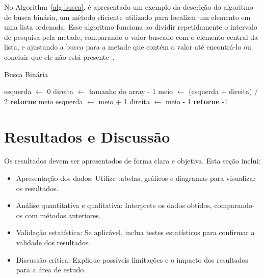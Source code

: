     No Algorithm~\ref{alg:busca}, é apresentado um exemplo da descrição do algoritmo de busca binária, um método eficiente utilizado para localizar um elemento em uma lista ordenada. Esse algoritmo funciona ao dividir repetidamente o intervalo de pesquisa pela metade, comparando o valor buscado com o elemento central da lista, e ajustando a busca para a metade que contém o valor até encontrá-lo ou concluir que ele não está presente~\cite{Cormen2009}.
    
    \begin{algorithm}
    \caption{Busca Binária}
    \label{alg:busca}
    \begin{algorithmic}[1]
            \State esquerda $\gets$ 0
            \State direita $\gets$ tamanho do array - 1
                \State meio $\gets$ (esquerda + direita) / 2
                    \State \textbf{retorne} meio
                    \State esquerda $\gets$ meio + 1
                \Else
                    \State direita $\gets$ meio - 1
                \EndIf
            \EndWhile
            \State \textbf{retorne} -1
        \EndProcedure
    \end{algorithmic}
\end{algorithm}

\section{ Resultados e Discussão}

Os resultados devem ser apresentados de forma clara e objetiva. Esta seção inclui:

\begin{itemize}
    \item Apresentação dos dados: Utilize tabelas, gráficos e diagramas para visualizar os resultados.

    \item  Análise quantitativa e qualitativa: Interprete os dados obtidos, comparando-os com métodos anteriores.

    \item Validação estatística: Se aplicável, inclua testes estatísticos para confirmar a validade dos resultados.

    \item Discussão crítica: Explique possíveis limitações e o impacto dos resultados para a área de estudo.

\end{itemize}

